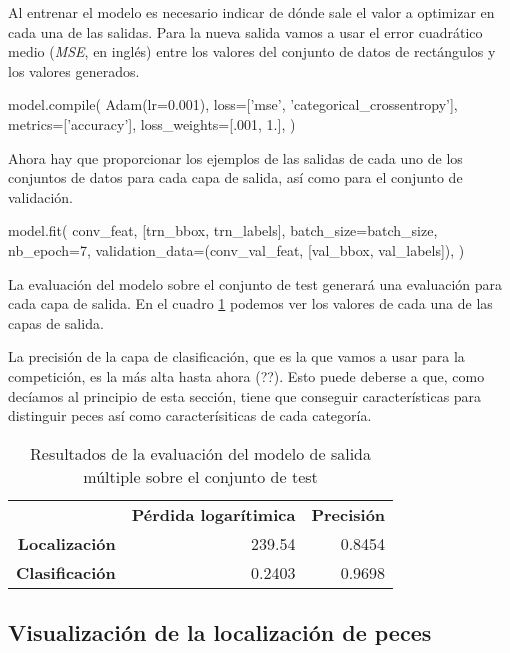 Al entrenar el modelo es necesario indicar de dónde sale el valor a optimizar en
cada una de las salidas. Para la nueva salida vamos a usar el error cuadrático
medio (\textit{MSE}, en inglés) entre los valores del conjunto de datos de rectángulos y los valores generados.

\begin{python}
model.compile(
    Adam(lr=0.001),
    loss=['mse', 'categorical_crossentropy'],
    metrics=['accuracy'],
    loss_weights=[.001, 1.],
)
\end{python}

Ahora hay que proporcionar los ejemplos de las salidas de cada uno de los
conjuntos de datos para cada capa de salida, así como para el conjunto de
validación.

\begin{python}
model.fit(
    conv_feat,
    [trn_bbox, trn_labels],
    batch_size=batch_size,
    nb_epoch=7,
    validation_data=(conv_val_feat, [val_bbox, val_labels]),
)
\end{python}

La evaluación del modelo sobre el conjunto de test generará una evaluación para
cada capa de salida. En el cuadro \ref{eval_multi} podemos ver los valores de
cada una de las capas de salida.

La precisión de la capa de clasificación, que es la que vamos a usar para la
competición, es la más alta hasta ahora (??). Esto puede deberse a que, como decíamos
al principio de esta sección, tiene que conseguir características para
distinguir peces así como caracterísiticas de cada categoría.

\begin{table}[]
\centering
\caption{Resultados de la evaluación del modelo de salida múltiple sobre el
conjunto de test}
\label{eval_multi}
\begin{tabular}{rrr}
                       & \textbf{Pérdida logarítimica} & \textbf{Precisión} \\
\textbf{Localización}  & 239.54                        & 0.8454             \\
\textbf{Clasificación} & 0.2403                        & 0.9698            
\end{tabular}
\end{table}

\subsection{Visualización de la localización de peces}

